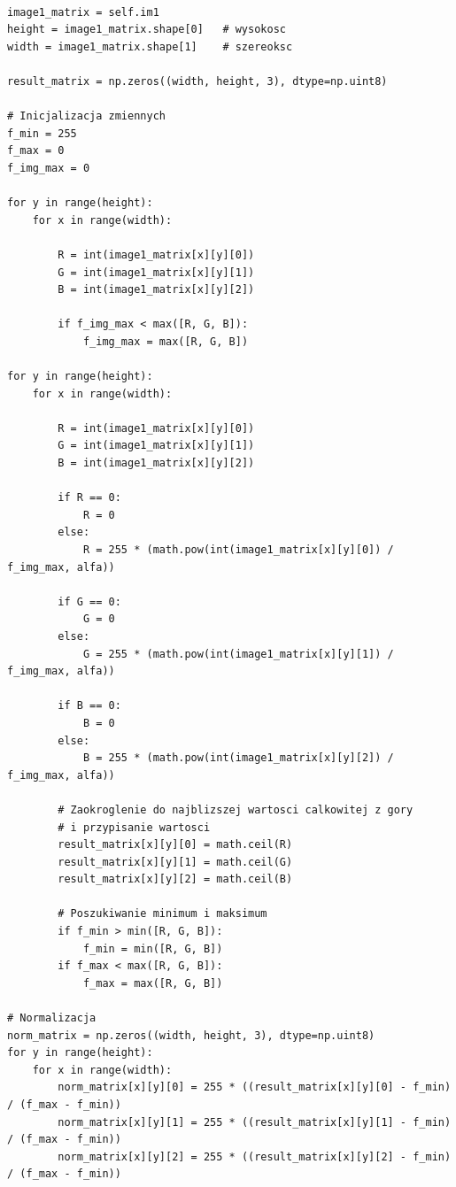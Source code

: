 \documentclass[final,a4paper,openany,12pt]{mwbk}
\begin{document}
\begin{lstlisting}[caption= Potęgowanie obrazu barwowego]

image1_matrix = self.im1
height = image1_matrix.shape[0]   # wysokosc
width = image1_matrix.shape[1]    # szereoksc

result_matrix = np.zeros((width, height, 3), dtype=np.uint8)

# Inicjalizacja zmiennych
f_min = 255
f_max = 0
f_img_max = 0

for y in range(height):
    for x in range(width):  

        R = int(image1_matrix[x][y][0])
        G = int(image1_matrix[x][y][1])
        B = int(image1_matrix[x][y][2])

        if f_img_max < max([R, G, B]):
            f_img_max = max([R, G, B])

for y in range(height):
    for x in range(width):  

        R = int(image1_matrix[x][y][0])
        G = int(image1_matrix[x][y][1])
        B = int(image1_matrix[x][y][2])

        if R == 0:
            R = 0
        else:
            R = 255 * (math.pow(int(image1_matrix[x][y][0]) / f_img_max, alfa))

        if G == 0:
            G = 0
        else:
            G = 255 * (math.pow(int(image1_matrix[x][y][1]) / f_img_max, alfa))
        
        if B == 0:
            B = 0
        else:
            B = 255 * (math.pow(int(image1_matrix[x][y][2]) / f_img_max, alfa))

        # Zaokroglenie do najblizszej wartosci calkowitej z gory
        # i przypisanie wartosci
        result_matrix[x][y][0] = math.ceil(R)
        result_matrix[x][y][1] = math.ceil(G)
        result_matrix[x][y][2] = math.ceil(B)

        # Poszukiwanie minimum i maksimum                
        if f_min > min([R, G, B]):
            f_min = min([R, G, B])
        if f_max < max([R, G, B]):
            f_max = max([R, G, B])

# Normalizacja
norm_matrix = np.zeros((width, height, 3), dtype=np.uint8)
for y in range(height):
    for x in range(width):
        norm_matrix[x][y][0] = 255 * ((result_matrix[x][y][0] - f_min) / (f_max - f_min))
        norm_matrix[x][y][1] = 255 * ((result_matrix[x][y][1] - f_min) / (f_max - f_min))
        norm_matrix[x][y][2] = 255 * ((result_matrix[x][y][2] - f_min) / (f_max - f_min))


\end{lstlisting}
\end{document}
